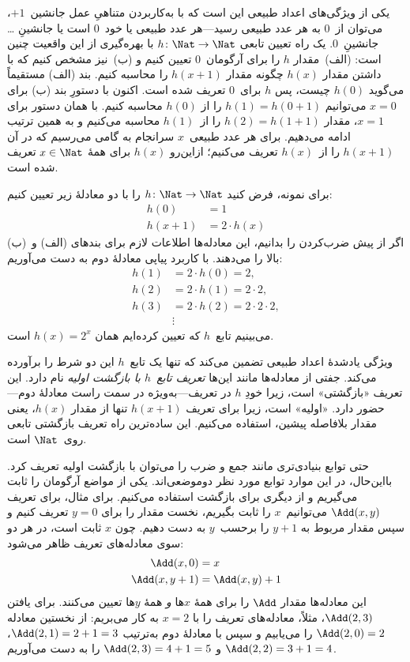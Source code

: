 \documentclass[../../../include/open-logic-section]{subfiles}
\begin{document}

یکی از ویژگی‌های اعداد طبیعی این است که با به‌کاربردن متناهیِ عمل
جانشین~$+1$، می‌توان از~$0$ به هر عدد طبیعی رسید---هر عدد طبیعی یا
خود~$0$ است یا جانشینِ \dots{} جانشینِ~$0$. یک راه تعیین تابعی
$h\colon\Nat \to \Nat$ با بهره‌گیری از این واقعیت چنین است:
(الف)~مقدار $h$ را برای آرگومان~$0$ تعیین کنیم و (ب)~نیز مشخص کنیم
که با داشتن مقدار $h(x)$ چگونه مقدار $h(x+1)$ را محاسبه کنیم. بند
(الف) مستقیماً می‌گوید $h(0)$ چیست، پس $h$ برای~$0$ تعریف شده است.
اکنون با دستورِ بند (ب) برای $x=0$ می‌توانیم $h(1)=h(0+1)$ را از
$h(0)$ محاسبه کنیم. با همان دستور برای $x=1$، مقدار
$h(2)=h(1+1)$ را از~$h(1)$ محاسبه می‌کنیم و به همین ترتیب ادامه
می‌دهیم. برای هر عدد طبیعی~$x$ سرانجام به گامی می‌رسیم که در آن
$h(x+1)$ را از~$h(x)$ تعریف می‌کنیم؛ ازاین‌رو $h(x)$ برای همهٔ
$x\in\Nat$ تعریف شده است.

برای نمونه، فرض کنید $h\colon \Nat \to \Nat$ را با دو معادلهٔ زیر
تعیین کنیم:
\begin{align*}
h(0) & =  1\\
h(x+1) & =  2 \cdot h(x)
\end{align*}
اگر از پیش ضرب‌کردن را بدانیم، این معادله‌ها اطلاعات لازم برای بندهای
(الف) و~(ب) بالا را می‌دهند. با کاربرد پیاپی معادلهٔ دوم به دست
می‌آوریم:
\begin{align*}
  h(1) & = 2\cdot h(0) = 2,\\
  h(2) & = 2\cdot h(1) = 2\cdot 2,\\
  h(3) & = 2 \cdot h(2) = 2\cdot 2 \cdot 2,\\
  & \vdots
\end{align*}
می‌بینیم تابع~$h$ که تعیین کرده‌ایم همان $h(x)=2^x$ است.

ویژگی یادشدهٔ اعداد طبیعی تضمین می‌کند که تنها یک تابع~$h$ این دو
شرط را برآورده می‌کند. جفتی از معادله‌ها مانند این‌ها
\emph{تعریف تابع~$h$ با بازگشت اولیه} نام دارد. این تعریف
«بازگشتی» است، زیرا خودِ $h$ در تعریف---به‌ویژه در سمت راست معادلهٔ
دوم---حضور دارد. «اولیه» است، زیرا برای تعریف $h(x+1)$ تنها از مقدار
$h(x)$، یعنی مقدار بلافاصله پیشین، استفاده می‌کنیم. این ساده‌ترین راه
تعریف بازگشتی تابعی روی~$\Nat$ است.

حتی توابع بنیادی‌تری مانند جمع و ضرب را می‌توان با بازگشت اولیه تعریف
کرد. بااین‌حال، در این موارد توابع مورد نظر دوموضعی‌اند. یکی از مواضع
آرگومان را ثابت می‌گیریم و از دیگری برای بازگشت استفاده می‌کنیم. برای
مثال، برای تعریف $\Add(x,y)$ می‌توانیم~$x$ را ثابت بگیریم، نخست مقدار
را برای $y=0$ تعریف کنیم و سپس مقدار مربوط به $y+1$ را برحسب~$y$
به دست دهیم. چون $x$ ثابت است، در هر دو سوی معادله‌های تعریف ظاهر
می‌شود:
\begin{align*}
\Add(x,0) & =  x\\
\Add(x,y+1) & =  \Add(x,y)+1
\end{align*}
این معادله‌ها مقدار $\Add$ را برای همهٔ $x$ها \emph{و} همهٔ $y$ها
تعیین می‌کنند. برای یافتن $\Add(2,3)$، مثلاً، معادله‌های تعریف را با
$x=2$ به کار می‌بریم: از نخستین معادله $\Add(2,0)=2$ را می‌یابیم و
سپس با معادلهٔ دوم به‌ترتیب
$\Add(2,1)=2+1=3$، $\Add(2,2)=3+1=4$ و $\Add(2,3)=4+1=5$ را به
دست می‌آوریم.
\end{document}
